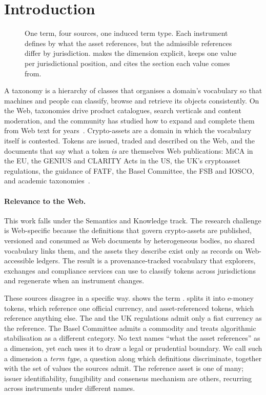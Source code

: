 \section{Introduction}
\label{sec:intro}
\begin{figure}[t]
  \centering
  
  \caption{One term, four sources, one induced term type. Each instrument
  defines  by what the asset references, but the admissible
  references differ by jurisdiction. \sys makes the dimension explicit, keeps
  one value per jurisdictional position, and cites the section each value comes
  from.}
  \label{fig:one}
\end{figure}

A taxonomy is a hierarchy of classes that organises a domain's vocabulary so
that machines and people can classify, browse and retrieve its objects
consistently. On the Web, taxonomies drive product catalogues, search
verticals and content moderation, and the community has studied how to expand
and complete them from Web text for years~\cite{shen2020taxoexpan,
wang2021hef,jiang2022taxoenrich,arous2023taxocomplete,shi2024icon}. Crypto-assets
are a domain in which the vocabulary itself is contested. Tokens are issued,
traded and described on the Web, and the documents that say what a token
\emph{is} are themselves Web publications: MiCA in the EU, the GENIUS and CLARITY Acts in the US, the UK's
cryptoasset regulations, the guidance of FATF, the Basel Committee, the FSB
and IOSCO, and academic taxonomies~\cite{tasca2019taxonomy,zhang2026cryptotaxonomy}.

\paragraph{Relevance to the Web.}
This work falls under the Semantics and Knowledge track. The research challenge
is Web-specific because the definitions that govern crypto-assets are
published, versioned and consumed as Web documents by heterogeneous bodies,
no shared vocabulary links them, and the assets they describe exist only as records on
Web-accessible ledgers. The result is a provenance-tracked vocabulary that
explorers, exchanges and compliance services can use to classify tokens across
jurisdictions and regenerate when an instrument changes.


These sources disagree in a specific way.  shows the term
.  splits it into e-money tokens, which reference one
official currency, and asset-referenced tokens, which reference anything else.
The  and the UK regulations admit only a fiat currency as the
reference. The Basel Committee admits a commodity and treats algorithmic
stabilisation as a different category. No text names ``what the asset references'' as a
dimension, yet each uses it to draw a legal or prudential boundary. We call such a dimension a \emph{term type}, a
question along which definitions discriminate, together with the set of values
the sources admit. The reference asset is one of many; issuer identifiability,
fungibility and consensus mechanism are others, recurring across instruments
under different names.

